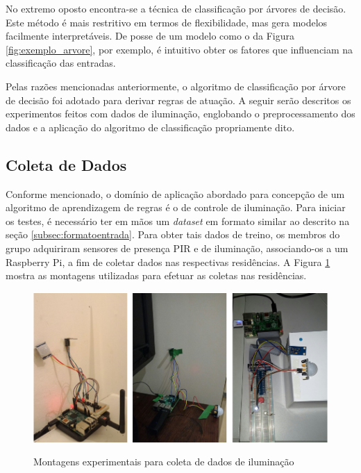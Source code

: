 No extremo oposto encontra-se a técnica de classificação por árvores de decisão. Este método é mais restritivo em termos de flexibilidade, mas gera modelos facilmente interpretáveis. De posse de um modelo como o da Figura \ref{fig:exemplo_arvore}, por exemplo, é intuitivo obter os fatores que influenciam na classificação das entradas.

Pelas razões mencionadas anteriormente, o algoritmo de classificação por árvore de decisão foi adotado para derivar regras de atuação. A seguir serão descritos os experimentos feitos com  dados de iluminação, englobando o preprocessamento dos dados e a aplicação do algoritmo de classificação propriamente dito.


\subsection{Coleta de Dados}
Conforme mencionado, o domínio de aplicação abordado para concepção de um algoritmo de aprendizagem de regras é o de controle de iluminação. Para iniciar os testes, é necessário ter em mãos um \textit{dataset} em formato similar ao descrito na seção \ref{subsec:formatoentrada}. Para obter tais dados de treino, os membros do grupo adquiriram sensores de presença PIR e de iluminação, associando-os a um Raspberry Pi, a fim de coletar dados nas respectivas residências. A Figura \ref{fig:montagem_coleta} mostra as montagens utilizadas para efetuar as coletas nas residências.

\begin{figure}[h]
	\centering
	\caption{Montagens experimentais para coleta de dados de iluminação}
	\smallskip
  \includegraphics[width=\textwidth]{imagens/montagem_coleta.png}
  \label{fig:montagem_coleta}  
\end{figure}

